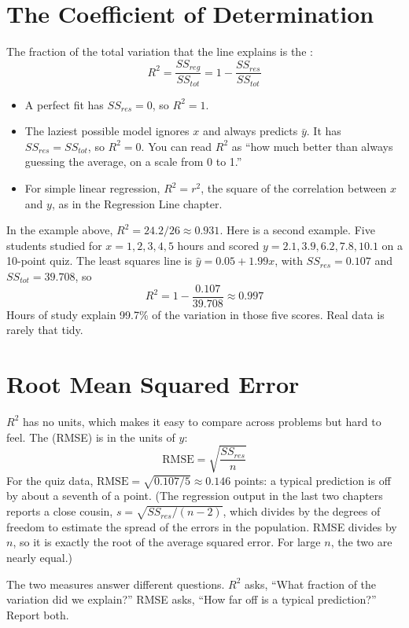 \section{The Coefficient of Determination}
The fraction of the total variation that the line explains is the :
$$R^2 = \frac{SS_{reg}}{SS_{tot}} = 1 - \frac{SS_{res}}{SS_{tot}}$$

\begin{itemize}
\item A perfect fit has $SS_{res} = 0$, so $R^2 = 1$.
\item The laziest possible model ignores $x$ and always predicts $\bar{y}$. It has $SS_{res} = SS_{tot}$, so
$R^2 = 0$. You can read $R^2$ as ``how much better than always guessing the average, on a scale from 0 to 1.''
\item For simple linear regression, $R^2 = r^2$, the square of the correlation between $x$ and $y$, as in the
Regression Line chapter.
\end{itemize}

In the example above, $R^2 = 24.2 / 26 \approx 0.931$. Here is a second example. Five students studied for
$x = 1, 2, 3, 4, 5$ hours and scored $y = 2.1, 3.9, 6.2, 7.8, 10.1$ on a 10-point quiz. The least squares line is
$\hat{y} = 0.05 + 1.99x$, with $SS_{res} = 0.107$ and $SS_{tot} = 39.708$, so
$$R^2 = 1 - \frac{0.107}{39.708} \approx 0.997$$
Hours of study explain 99.7\% of the variation in those five scores. Real data is rarely that tidy.

\section{Root Mean Squared Error}
$R^2$ has no units, which makes it easy to compare across problems but hard to feel. The  (RMSE) is in the units of $y$:
$$\text{RMSE} = \sqrt{\frac{SS_{res}}{n}}$$
For the quiz data, $\text{RMSE} = \sqrt{0.107/5} \approx 0.146$ points: a typical prediction is off by about
a seventh of a point. (The regression output in the last two chapters reports a close cousin,
$s = \sqrt{SS_{res}/(n - 2)}$, which divides by the degrees of freedom to estimate the spread of the errors in
the population. RMSE divides by $n$, so it is exactly the root of the average squared error. For large $n$, the
two are nearly equal.)

The two measures answer different questions. $R^2$ asks, ``What fraction of the variation did we explain?''
RMSE asks, ``How far off is a typical prediction?'' Report both.

